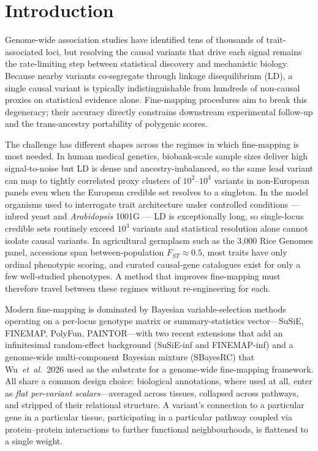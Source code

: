 \section*{Introduction}

Genome-wide association studies have identified tens of thousands of
trait-associated loci\cite{visscher2017years,buniello2019nhgri},
but resolving the causal variants that drive each signal remains the
rate-limiting step between statistical discovery and mechanistic
biology. Because nearby variants co-segregate through linkage
disequilibrium (LD), a single causal variant is typically
indistinguishable from hundreds of non-causal proxies on statistical
evidence alone. Fine-mapping procedures aim to break this
degeneracy\cite{schaid2018genome,ulirsch2021fine}; their accuracy
directly constrains downstream experimental follow-up and the
trans-ancestry portability of polygenic scores.

The challenge has different shapes across the regimes in which
fine-mapping is most needed. In human medical genetics, biobank-scale
sample sizes deliver high signal-to-noise but LD is dense and
ancestry-imbalanced, so the same lead variant can map to tightly
correlated proxy clusters of $10^2$--$10^3$ variants in non-European
panels even when the European credible set resolves to a singleton.
In the model organisms used to interrogate trait architecture under
controlled conditions --- inbred yeast and \emph{Arabidopsis} 1001G ---
LD is exceptionally long, so single-locus credible sets routinely
exceed $10^3$ variants and statistical resolution alone cannot
isolate causal variants. In agricultural germplasm such as the
3{,}000 Rice Genomes panel\cite{wang2018genomic}, accessions span
between-population $F_{ST}\!\approx\!0.5$, most traits have only
ordinal phenotypic scoring, and curated causal-gene catalogues exist
for only a few well-studied phenotypes\cite{ren2023rice}. A method
that improves fine-mapping must therefore travel between these
regimes without re-engineering for each.

Modern fine-mapping is dominated by Bayesian variable-selection
methods operating on a per-locus genotype matrix or summary-statistics
vector---SuSiE\cite{wang2020simple}, FINEMAP\cite{benner2016finemap},
PolyFun\cite{weissbrod2020polyfun},
PAINTOR\cite{kichaev2014integrating}---with two recent extensions
that add an infinitesimal random-effect background
(SuSiE-inf and FINEMAP-inf)\cite{cui2024improving} and a genome-wide
multi-component Bayesian mixture
(SBayesRC)\cite{zheng2024leveraging} that
Wu~\emph{et~al.}~2026\cite{wu2026genome} used as the substrate for a
genome-wide fine-mapping framework. All share a common design choice:
biological annotations, where used at all, enter as \emph{flat
per-variant scalars}---averaged across tissues, collapsed across
pathways, and stripped of their relational structure. A variant's
connection to a particular gene in a particular tissue, participating
in a particular pathway coupled via protein--protein interactions to
further functional neighbourhoods, is flattened to a single weight.

